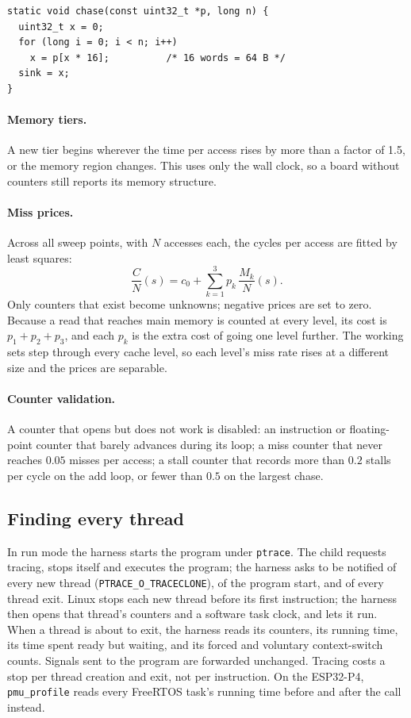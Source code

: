 \documentclass[10pt,a4paper,twocolumn]{article}
\newcommand{\code}[1]{\texttt{\small #1}}
\begin{document}
\begin{lstlisting}[caption={Pointer-chasing loop; each load waits for the previous one.},label={lst:chase}]
static void chase(const uint32_t *p, long n) {
  uint32_t x = 0;
  for (long i = 0; i < n; i++)
    x = p[x * 16];          /* 16 words = 64 B */
  sink = x;
}
\end{lstlisting}

\paragraph{Memory tiers.} A new tier begins wherever the time per access rises by more than a factor of 1.5, or the memory region changes. This uses only the wall clock, so a board without counters still reports its memory structure.

\paragraph{Miss prices.} Across all sweep points, with $N$ accesses each, the cycles per access are fitted by least squares:
\begin{equation}
\frac{C}{N}(s) = c_0 + \sum_{k=1}^{3} p_k\,\frac{M_k}{N}(s).
\end{equation}
Only counters that exist become unknowns; negative prices are set to zero. Because a read that reaches main memory is counted at every level, its cost is $p_1+p_2+p_3$, and each $p_k$ is the extra cost of going one level further. The working sets step through every cache level, so each level's miss rate rises at a different size and the prices are separable.

\paragraph{Counter validation.} A counter that opens but does not work is disabled: an instruction or floating-point counter that barely advances during its loop; a miss counter that never reaches $0.05$ misses per access; a stall counter that records more than $0.2$ stalls per cycle on the add loop, or fewer than $0.5$ on the largest chase.

\subsection{Finding every thread}
In run mode the harness starts the program under \code{ptrace}. The child requests tracing, stops itself and executes the program; the harness asks to be notified of every new thread (\code{PTRACE\_O\_TRACECLONE}), of the program start, and of every thread exit. Linux stops each new thread before its first instruction; the harness then opens that thread's counters and a software task clock, and lets it run. When a thread is about to exit, the harness reads its counters, its running time, its time spent ready but waiting, and its forced and voluntary context-switch counts. Signals sent to the program are forwarded unchanged. Tracing costs a stop per thread creation and exit, not per instruction. On the ESP32-P4, \code{pmu\_profile} reads every FreeRTOS task's running time before and after the call instead.
\end{document}
